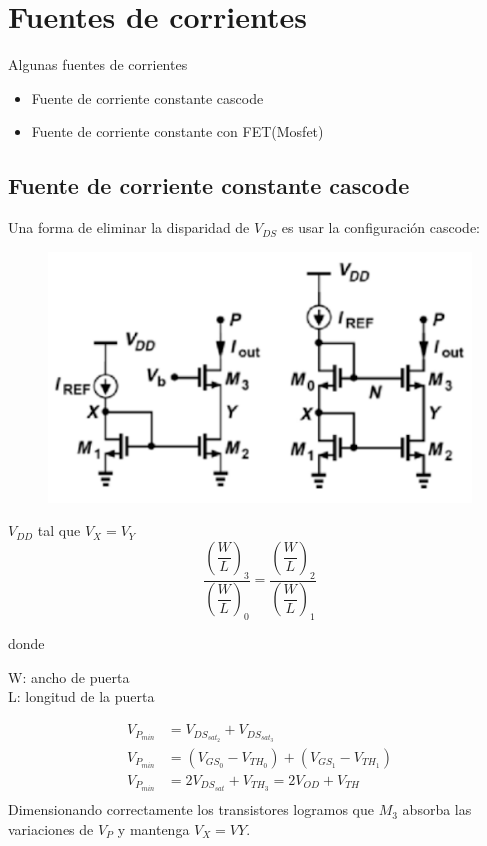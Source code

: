 \documentclass[conference]{IEEEtran} %
\begin{document}
\section{Fuentes de corrientes}
Algunas fuentes de corrientes
	\begin{itemize}
		\item Fuente de corriente constante cascode
		\item Fuente de corriente constante con FET(Mosfet)
	\end{itemize}


\subsection{Fuente de corriente constante cascode}


	Una forma de eliminar la disparidad de $V_{DS}$ es usar la configuración
	cascode:
	\begin{figure}[!ht]
		\includegraphics[scale=0.3]{IMAGENES/image3.png}
	\end{figure}
	$V_{DD}$ tal que $V_X = V_Y$
	$$\dfrac{\left(\dfrac{W}{L}\right)_3}
	{\left(\dfrac{W}{L}\right)_0} = 
	\dfrac{\left(\dfrac{W}{L}\right)_2}
	{\left(\dfrac{W}{L}\right)_1}$$ 
	
	donde
	\begin{center}
		\hspace{-5mm}W: ancho de puerta\\
		L: longitud de la puerta
	\end{center}



	\begin{align}
		V_{P_{min}} &= V_{DS_{sat_{2}}} + V_{DS_{sat_3}} \\
		V_{P_{min}} &= (V_{GS_0} - V_{TH_0}) + (V_{GS_1} - V_{TH_1}) \\
		V_{P_{min}} &= 2V_{DS_{sat}} + V_{TH_3} = 2V_{OD} + V_{TH} \\
	\end{align}
	Dimensionando correctamente los transistores logramos que $M_3$
	absorba las variaciones de $V_P$ y mantenga $V_X = VY$.\newline
	
\end{document}
